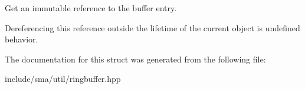 Get an immutable reference to the buffer entry. 

Dereferencing this reference outside the lifetime of the current object is undefined behavior. 

The documentation for this struct was generated from the following file\-:\begin{DoxyCompactItemize}
\item 
include/sma/util/ringbuffer.\-hpp\end{DoxyCompactItemize}
